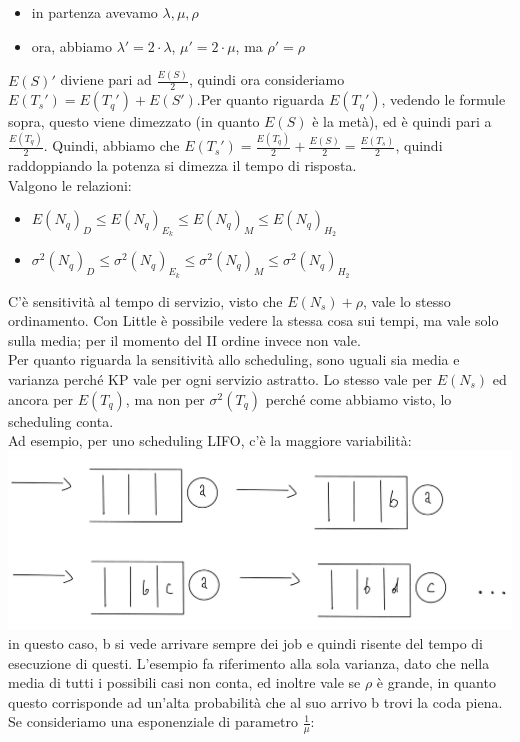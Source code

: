 \documentclass{article}
\begin{document}
\begin{itemize}
\item in partenza avevamo $\lambda, \mu, \rho$
\item ora, abbiamo $\lambda' = 2\cdot \lambda$, $\mu' = 2\cdot \mu$, ma $\rho' = \rho$
\end{itemize}
$E(S)'$ diviene pari ad $\frac{E(S)}{2}$, quindi ora consideriamo $E(T_s') = E(T_q') + E(S')$.Per quanto riguarda $E(T_q')$, vedendo le formule sopra, questo viene dimezzato (in quanto $E(S)$ è la metà), ed è quindi pari a $\frac{E(T_q)}{2}$. Quindi, abbiamo che $E(T_s') = \frac{E(T_q)}{2} + \frac{E(S)}{2} = \frac{E(T_s)}{2}$, quindi raddoppiando la potenza si dimezza il tempo di risposta.\\ Valgono le relazioni:
\begin{itemize}
\item $E(N_q)_D \leq E(N_q)_{E_k} \leq E(N_q)_M \leq E(N_q)_{H_2}$
\item $\sigma^2(N_q)_D \leq \sigma^2(N_q)_{E_k} \leq \sigma^2(N_q)_M \leq \sigma^2(N_q)_{H_2}$
\end{itemize}
C'è sensitività al tempo di servizio, visto che $E(N_s) + \rho$, vale lo stesso ordinamento. Con Little è possibile vedere la stessa cosa sui tempi, ma vale solo sulla media; per il momento del II ordine invece non vale.\\ Per quanto riguarda la sensitività allo scheduling, sono uguali sia media e varianza perché KP vale per ogni servizio astratto. Lo stesso vale per $E(N_s)$ ed ancora per $E(T_q)$, ma non per $\sigma^2(T_q)$ perché come abbiamo visto, lo scheduling conta.\\ Ad esempio, per uno scheduling LIFO, c'è la maggiore variabilità:\\
\includegraphics[scale=0.3]{images/PMCSN1003.jpeg}\\ in questo caso, b si vede arrivare sempre dei job e quindi risente del tempo di esecuzione di questi. L'esempio fa riferimento alla sola varianza, dato che nella media di tutti i possibili casi non conta, ed inoltre vale se $\rho$ è grande, in quanto questo corrisponde ad un'alta probabilità che al suo arrivo b trovi la coda piena.\\ Se consideriamo una esponenziale di parametro $\frac{1}{\mu}$:
\end{document}
